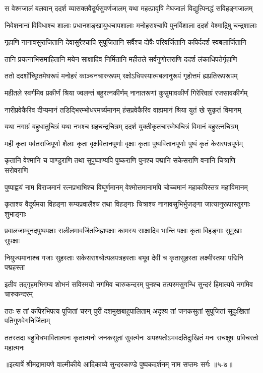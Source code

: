 
\twolineshloka
{स वेश्मजालं बलवान् ददर्श व्यासक्तवैदूर्यसुवर्णजालम्}
{यथा महत्प्रावृषि मेघजालं विद्युत्पिनद्धं सविहङ्गजालम्} %

\twolineshloka
{निवेशनानां विविधाश्च शालाः प्रधानशङ्खायुधचापशालाः}
{मनोहराश्चापि पुनर्विशाला ददर्श वेश्माद्रिषु चन्द्रशालाः} %

\twolineshloka
{गृहाणि नानावसुराजितानि देवासुरैश्चापि सुपूजितानि}
{सर्वैश्च दोषैः परिवर्जितानि कपिर्ददर्श स्वबलार्जितानि} %

\twolineshloka
{तानि प्रयत्नाभिसमाहितानि मयेन साक्षादिव निर्मितानि}
{महीतले सर्वगुणोत्तराणि ददर्श लंकाधिपतेर्गृहाणि} %

\twolineshloka
{ततो ददर्शोच्छ्रितमेघरूपं मनोहरं काञ्चनचारुरूपम्}
{रक्षोऽधिपस्यात्मबलानुरूपं गृहोत्तमं ह्यप्रतिरूपरूपम्} %

\twolineshloka
{महीतले स्वर्गमिव प्रकीर्णं श्रिया ज्वलन्तं बहुरत्नकीर्णम्}
{नानातरूणां कुसुमावकीर्णं गिरेरिवाग्रं रजसावकीर्णम्} %

\twolineshloka
{नारीप्रवेकैरिव दीप्यमानं तडिद्भिरम्भोधरमर्च्यमानम्}
{हंसप्रवेकैरिव वाह्यमानं श्रिया युतं खे सुकृतं विमानम्} %

\twolineshloka
{यथा नगाग्रं बहुधातुचित्रं यथा नभश्च ग्रहचन्द्रचित्रम्}
{ददर्श युक्तीकृतचारुमेघचित्रं विमानं बहुरत्नचित्रम्} %

\twolineshloka
{मही कृता पर्वतराजिपूर्णा शैलाः कृता वृक्षवितानपूर्णाः}
{वृक्षाः कृताः पुष्पवितानपूर्णाः पुष्पं कृतं केसरपत्रपूर्णम्} %

\twolineshloka
{कृतानि वेश्मानि च पाण्डुराणि तथा सुपुष्पाण्यपि पुष्कराणि}
{पुनश्च पद्मानि सकेसराणि वनानि चित्राणि सरोवराणि} %

\twolineshloka
{पुष्पाह्वयं नाम विराजमानं रत्नप्रभाभिश्च विघूर्णमानम्}
{वेश्मोत्तमानामपि चोच्चमानं महाकपिस्तत्र महाविमानम्} %

\twolineshloka
{कृताश्च वैदूर्यमया विहङ्गा रूप्यप्रवालैश्च तथा विहङ्गाः}
{चित्राश्च नानावसुभिर्भुजङ्गा जात्यानुरूपास्तुरगाः शुभाङ्गाः} %

\twolineshloka
{प्रवालजाम्बूनदपुष्पपक्षाः सलीलमावर्जितजिह्मपक्षाः}
{कामस्य साक्षादिव भान्ति पक्षाः कृता विहङ्गाः सुमुखाः सुपक्षाः} %

\twolineshloka
{नियुज्यमानाश्च गजाः सुहस्ताः सकेसराश्चोत्पलपत्रहस्ताः}
{बभूव देवी च कृतासुहस्ता लक्ष्मीस्तथा पद्मिनि पद्महस्ता} %

\twolineshloka
{इतीव तद्गृहमभिगम्य शोभनं सविस्मयो नगमिव चारुकन्दरम्}
{पुनश्च तत्परमसुगन्धि सुन्दरं हिमात्यये नगमिव चारुकन्दरम्} %

\twolineshloka
{ततः स तां कपिरभिपत्य पूजितां चरन् पुरीं दशमुखबाहुपालिताम्}
{अदृश्य तां जनकसुतां सुपूजितां सुदुःखितां पतिगुणवेगनिर्जिताम्} %

\twolineshloka
{ततस्तदा बहुविधभावितात्मनः कृतात्मनो जनकसुतां सुवर्त्मनः}
{अपश्यतोऽभवदतिदुःखितं मनः सचक्षुषः प्रविचरतो महात्मनः} %


॥इत्यार्षे श्रीमद्रामायणे वाल्मीकीये आदिकाव्ये सुन्दरकाण्डे पुष्पकदर्शनम् नाम सप्तमः सर्गः ॥५-७॥
